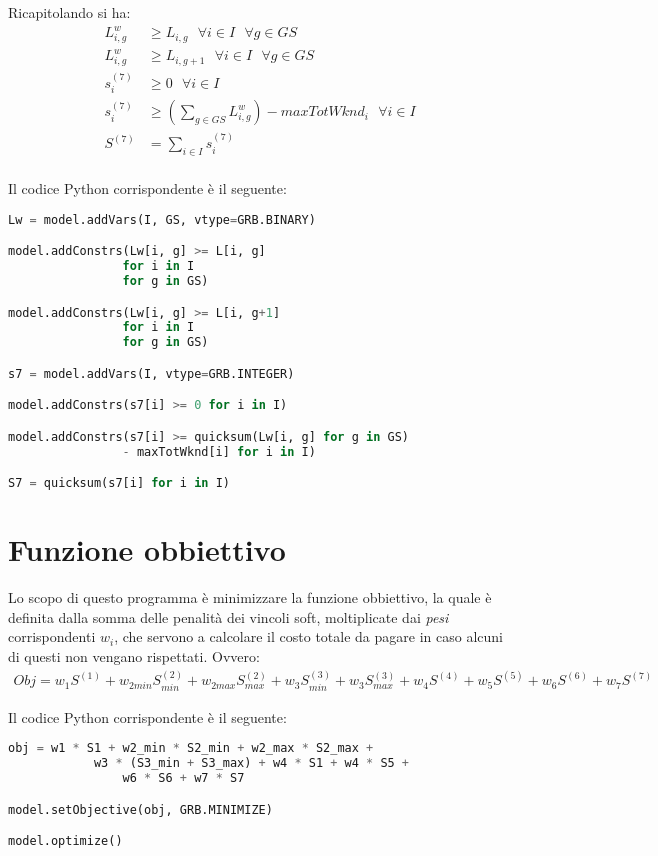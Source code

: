 Ricapitolando si ha:
\begin{equation}
\begin{split}
L_{i, g}^w &\geq L_{i, g} ~~~ \forall i \in I ~~~ \forall g \in GS \\
L_{i, g}^w &\geq L_{i, g+1} ~~~ \forall i \in I ~~~ \forall g \in GS \\
s^{(7)}_{i} &\geq 0  ~~~ \forall i \in I \\
s^{(7)}_{i} &\geq (\sum_{g \in GS} L_{i, g}^w ) - maxTotWknd_i ~~~ \forall i \in I \\
S^{(7)} &= \sum_{i \in I} s^{(7)}_{i} \\
\end{split}
\end{equation}

Il codice Python corrispondente è il seguente:
\begin{lstlisting}[language=Python]
Lw = model.addVars(I, GS, vtype=GRB.BINARY)

model.addConstrs(Lw[i, g] >= L[i, g] 
                for i in I
                for g in GS)

model.addConstrs(Lw[i, g] >= L[i, g+1] 
                for i in I
                for g in GS)

s7 = model.addVars(I, vtype=GRB.INTEGER)

model.addConstrs(s7[i] >= 0 for i in I)

model.addConstrs(s7[i] >= quicksum(Lw[i, g] for g in GS) 
                - maxTotWknd[i] for i in I)

S7 = quicksum(s7[i] for i in I)
\end{lstlisting}

\newpage 
\section{Funzione obbiettivo}
Lo scopo di questo programma è minimizzare la funzione obbiettivo, la quale è definita dalla somma delle penalità dei vincoli soft, moltiplicate dai \textit{pesi} corrispondenti $w_i$, che servono a calcolare il costo totale da pagare in caso alcuni di questi non vengano rispettati. Ovvero:
\begin{gather}
Obj = w_1 S^{(1)} + w_{2min} S^{(2)}_{min} + w_{2max} S^{(2)}_{max} + w_3 S^{(3)}_{min} + w_3 S^{(3)}_{max} + w_4 S^{(4)} + w_5 S^{(5)} + w_6 S^{(6)} + w_7 S^{(7)} 
\end{gather}

Il codice Python corrispondente è il seguente:
\begin{lstlisting}[language=Python]
obj = w1 * S1 + w2_min * S2_min + w2_max * S2_max + 
			w3 * (S3_min + S3_max) + w4 * S1 + w4 * S5 + 
				w6 * S6 + w7 * S7

model.setObjective(obj, GRB.MINIMIZE)

model.optimize()
\end{lstlisting}

